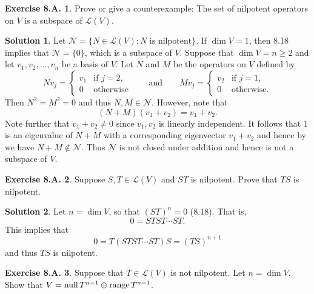 \documentclass[12pt]{article}
\theoremstyle{definition}
\theoremstyle{exercise}
\newtheorem{exercise}{Exercise 8.A.}
\theoremstyle{solution}
\newtheorem*{solution}{Solution}
\newcommand{\lmap}{\mathcal{L}}
\newcommand{\Null}{\text{null\,}}
\newcommand{\Range}{\text{range\,}}
\newcommand{\quand}{\quad \text{and} \quad}
\begin{document}
\begin{exercise}
\label{ex:8}
    Prove or give a counterexample: The set of nilpotent operators on \( V \) is a subspace of \( \lmap(V) \).
\end{exercise}

\begin{solution}
    Let \( \mathcal{N} = \{ N \in \lmap(V) : N \text{ is nilpotent} \} \). If \( \dim V = 1 \), then 8.18 implies that \( \mathcal{N} = \{ 0 \} \), which is a subspace of \( V \). Suppose that \( \dim V = n \geq 2 \) and let \( v_1, v_2, \ldots, v_n \) be a basis of \( V \). Let \( N \) and \( M \) be the operators on \( V \) defined by
    \[
        N v_j = \begin{cases}
            v_1 & \text{if } j = 2, \\
            0 & \text{otherwise}
        \end{cases}
        \quad
        \quand
        \quad
        M v_j = \begin{cases}
            v_2 & \text{if } j = 1, \\
            0 & \text{otherwise}.
        \end{cases}
    \]
    Then \( N^2 = M^2 = 0 \) and thus \( N, M \in \mathcal{N} \). However, note that
    \[
        (N + M)(v_1 + v_2) = v_1 + v_2.
    \]
    Note further that \( v_1 + v_2 \neq 0 \) since \( v_1, v_2 \) is linearly independent. It follows that 1 is an eigenvalue of \( N + M \) with a corresponding eigenvector \( v_1 + v_2 \) and hence by  we have \( N + M \not\in \mathcal{N} \). Thus \( \mathcal{N} \) is not closed under addition and hence is not a subspace of \( V \).
\end{solution}

\begin{exercise}
\label{ex:9}
    Suppose \( S, T \in \lmap(V) \) and \( ST \) is nilpotent. Prove that \( TS \) is nilpotent.
\end{exercise}

\begin{solution}
    Let \( n = \dim V \), so that \( (ST)^n = 0 \) (8.18). That is,
    \[
        0 = ST ST \cdots ST.
    \]
    This implies that
    \[
        0 = T (ST ST \cdots ST) S = (TS)^{n+1}
    \]
    and thus \( TS \) is nilpotent.
\end{solution}

\begin{exercise}
\label{ex:10}
    Suppose that \( T \in \lmap(V) \) is not nilpotent. Let \( n = \dim V \). Show that \( V = \Null T^{n-1} \oplus \Range T^{n-1} \).
\end{exercise}
\end{document}
